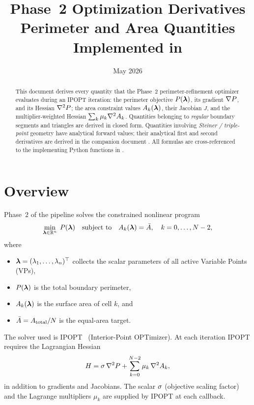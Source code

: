 \documentclass[11pt,a4paper]{article}
\title{%
  \textbf{Phase~2 Optimization Derivatives}\\[0.5em]
  \large Perimeter and Area Quantities Implemented in \codefile{surface-partition}
}
\author{}
\date{May 2026}
\begin{document}
\maketitle

\begin{abstract}
This document derives every quantity that the Phase~2 perimeter-refinement
optimizer evaluates during an IPOPT iteration: the perimeter objective
$P(\boldsymbol{\lambda})$, its gradient $\nabla P$, and its Hessian $\nabla^2 P$; the area
constraint values $A_k(\boldsymbol{\lambda})$, their Jacobian $J$, and the
multiplier-weighted Hessian $\sum_k \mu_k \nabla^2 A_k$.  Quantities
belonging to \emph{regular} boundary segments and triangles are derived in
closed form.  Quantities involving \emph{Steiner / triple-point} geometry
have analytical forward values; their analytical first and second
derivatives are derived in the companion document
.  All formulas are
cross-referenced to the implementing Python functions in
.
\end{abstract}

\tableofcontents
\newpage

\section{Overview}

Phase~2 of the  pipeline solves the constrained
nonlinear program
\begin{equation}
  \min_{\boldsymbol{\lambda} \in \mathbb{R}^n}\; P(\boldsymbol{\lambda})
  \quad\text{subject to}\quad
  A_k(\boldsymbol{\lambda}) = \bar{A},\quad k = 0,\ldots,N-2,
  \label{eq:nlp}
\end{equation}
where
\begin{itemize}[noitemsep]
  \item $\boldsymbol{\lambda} = (\lambda_1,\ldots,\lambda_n)^\top$ collects the scalar parameters
        of all active Variable Points (VPs),
  \item $P(\boldsymbol{\lambda})$ is the total boundary perimeter,
  \item $A_k(\boldsymbol{\lambda})$ is the surface area of cell $k$, and
  \item $\bar{A} = A_{\mathrm{total}}/N$ is the equal-area target.
\end{itemize}
The solver used is IPOPT~\cite{wachter2006ipopt} (Interior-Point OPTimizer).
At each iteration IPOPT requires the Lagrangian Hessian
\begin{equation}
  H = \sigma\,\nabla^2 P + \sum_{k=0}^{N-2} \mu_k\,\nabla^2 A_k,
  \label{eq:lag-hess}
\end{equation}
in addition to gradients and Jacobians.  The scalar $\sigma$ (objective
scaling factor) and the Lagrange multipliers $\mu_k$ are supplied by IPOPT
at each callback.
\end{document}
